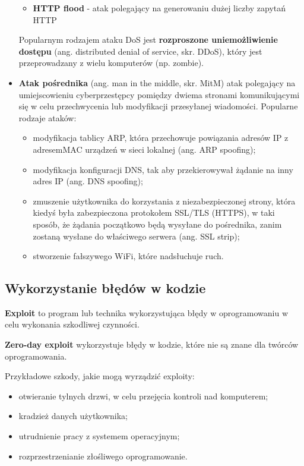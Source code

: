 \documentclass{article}
\begin{document}
\begin{itemize}
\begin{itemize}
    \item \textbf{HTTP flood} - atak polegający na generowaniu dużej liczby zapytań HTTP
\end{itemize}
    Popularnym rodzajem ataku DoS jest \textbf{rozproszone uniemożliwienie dostępu} (ang. distributed denial of service, skr. DDoS), który jest przeprowadzany z wielu komputerów (np. zombie).
    \item \textbf{Atak pośrednika} (ang. man in the middle, skr. MitM) atak polegający na umiejscowieniu cyberprzestępcy pomiędzy dwiema stronami komunikującymi się w celu przechwycenia lub modyfikacji przesyłanej wiadomości. Popularne rodzaje ataków:
\begin{itemize}
    \item modyfikacja tablicy ARP, która przechowuje powiązania adresów IP z adresemMAC urządzeń w sieci lokalnej (ang. ARP spoofing);
    \item modyfikacja konfiguracji DNS, tak aby przekierowywał żądanie na inny adres IP (ang. DNS spoofing);
    \item zmuszenie użytkownika do korzystania z niezabezpieczonej strony, która kiedyś była zabezpieczona protokołem SSL/TLS (HTTPS), w taki sposób, że żądania początkowo będą wysyłane do pośrednika, zanim zostaną wysłane do właściwego serwera (ang. SSL strip); 
    \item stworzenie fałszywego WiFi, które nadsłuchuje ruch.
\end{itemize}
\end{itemize}

\subsection{Wykorzystanie błędów w kodzie}
\textbf{Exploit} to program lub technika wykorzystująca błędy w oprogramowaniu w celu wykonania szkodliwej czynności.

\textbf{Zero-day exploit} wykorzystuje błędy w kodzie, które nie są znane dla twórców oprogramowania.

Przykładowe szkody, jakie mogą wyrządzić exploity:
\begin{itemize}
    \item otwieranie tylnych drzwi, w celu przejęcia kontroli nad komputerem;
    \item kradzież danych użytkownika;
    \item utrudnienie pracy z systemem operacyjnym;
    \item rozprzestrzenianie złośliwego oprogramowanie.
\end{itemize}
\end{document}
